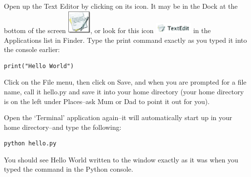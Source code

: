 \begin{MAC}
Open up the Text Editor by clicking on its icon.  It may be in the Dock at the bottom of the screen \includegraphics*[width=12mm]{textedit-icon.eps}, or look for this icon \includegraphics*[width=19mm]{textedit-icon2.eps} in the Applications list in Finder.  Type the print command exactly as you typed it into the console earlier:

\begin{listing}
\begin{verbatim}
print("Hello World")
\end{verbatim}
\end{listing}

Click on the File menu, then click on Save, and when you are prompted for a file name, call it hello.py and save it into your home directory (your home directory is on the left under Places--ask Mum or Dad to point it out for you).

Open the `Terminal' application again--it will automatically start up in your home directory--and type the following:

\begin{listing}
\begin{verbatim}
python hello.py
\end{verbatim}
\end{listing}

You should see Hello World written to the window exactly as it was when you typed the command in the Python console.

\end{MAC}

